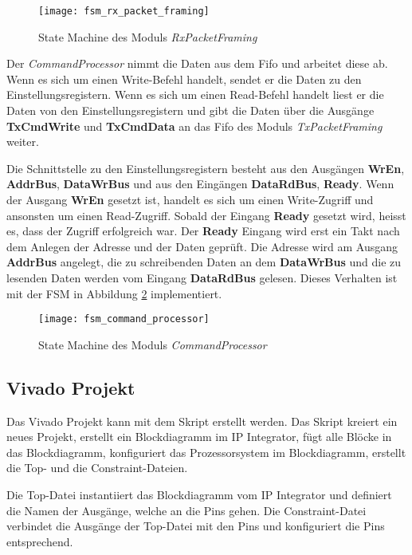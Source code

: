 \begin{figure}[H]
    \centering
    \texttt{[image: fsm\_rx\_packet\_framing]}
    \caption{State Machine des Moduls \textit{RxPacketFraming}}
    \label{fig:fsm_rx_packet_framing}
\end{figure}

Der \textit{CommandProcessor} nimmt die Daten aus dem Fifo und arbeitet diese ab. Wenn es sich um einen Write-Befehl handelt, sendet er die Daten zu den Einstellungsregistern. Wenn es sich um einen Read-Befehl handelt liest er die Daten von den Einstellungsregistern und gibt die Daten über die Ausgänge \textbf{TxCmdWrite} und \textbf{TxCmdData} an das Fifo des Moduls \textit{TxPacketFraming} weiter.

Die Schnittstelle zu den Einstellungsregistern besteht aus den Ausgängen \textbf{WrEn}, \textbf{AddrBus}, \textbf{DataWrBus} und aus den Eingängen \textbf{DataRdBus}, \textbf{Ready}.
Wenn der Ausgang \textbf{WrEn} gesetzt ist, handelt es sich um einen Write-Zugriff und ansonsten um einen Read-Zugriff. Sobald der Eingang \textbf{Ready} gesetzt wird, heisst es, dass der Zugriff erfolgreich war. Der \textbf{Ready} Eingang wird erst ein Takt nach dem Anlegen der Adresse und der Daten geprüft. Die Adresse wird am Ausgang \textbf{AddrBus} angelegt, die zu schreibenden Daten an dem \textbf{DataWrBus} und die zu lesenden Daten werden vom Eingang \textbf{DataRdBus} gelesen. Dieses Verhalten ist mit der FSM in Abbildung \ref{fig:fsm_command_processor} implementiert.

\begin{figure}[tb]
    \centering
    \texttt{[image: fsm\_command\_processor]}
    \caption{State Machine des Moduls \textit{CommandProcessor}}
    \label{fig:fsm_command_processor}
\end{figure}

\subsection{Vivado Projekt}
Das Vivado Projekt kann mit dem Skript erstellt werden. Das Skript kreiert ein neues Projekt, erstellt ein Blockdiagramm im IP Integrator, fügt alle Blöcke in das Blockdiagramm, konfiguriert das Prozessorsystem im Blockdiagramm, erstellt die Top- und die Constraint-Dateien.

Die Top-Datei instantiiert das Blockdiagramm vom IP Integrator und definiert die Namen der Ausgänge, welche an die Pins gehen. Die Constraint-Datei verbindet die Ausgänge der Top-Datei mit den Pins und konfiguriert die Pins entsprechend. 

